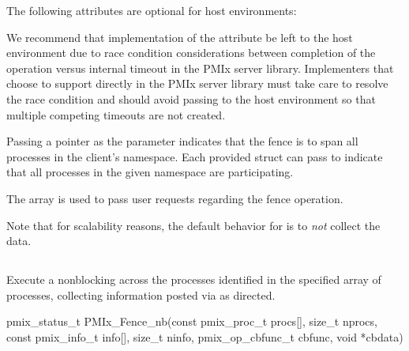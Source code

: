 
\reqattrend

\optattrstart
The following attributes are optional for host environments:


\optattrend

\adviceimplstart
We recommend that implementation of the  attribute be left to the host environment due to race condition considerations between completion of the operation versus internal timeout in the \ac{PMIx} server library. Implementers that choose to support  directly in the \ac{PMIx} server library must take care to resolve the race condition and should avoid passing  to the host environment so that multiple competing timeouts are not created.
\adviceimplend

\descr

Passing a  pointer as the  parameter indicates that the fence is to span all processes in the client's namespace.
Each provided  struct can pass  to indicate that all processes in the given namespace are participating.

The  array is used to pass user requests regarding the fence operation.

Note that for scalability reasons, the default behavior for  is to \emph{not} collect the data.


\subsection{}

\summary

Execute a nonblocking  across the processes identified in the specified array of processes, collecting information posted via  as directed.

\format

\cspecificstart
\begin{codepar}
pmix_status_t
PMIx_Fence_nb(const pmix_proc_t procs[], size_t nprocs,
              const pmix_info_t info[], size_t ninfo,
              pmix_op_cbfunc_t cbfunc, void *cbdata)
\end{codepar}
\cspecificend

